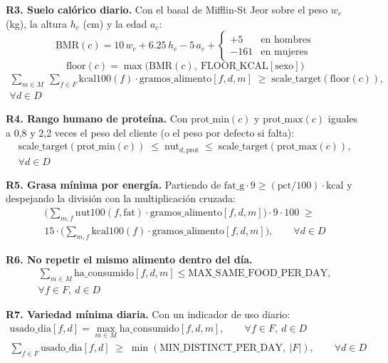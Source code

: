 \textbf{R3. Suelo calórico diario.} Con el basal de Mifflin-St Jeor sobre el peso $w_c$ (kg), la altura $h_c$ (cm) y la edad $a_c$:
\begin{equation*}
\text{BMR}(c) = 10\,w_c + 6.25\,h_c - 5\,a_c +
\begin{cases}
+5 & \text{en hombres} \\
-161 & \text{en mujeres}
\end{cases}
\end{equation*}
\begin{equation*}
\text{floor}(c) = \max\big(\text{BMR}(c),\ \text{FLOOR\_KCAL}[\text{sexo}]\big)
\end{equation*}
\begin{gather*}
\sum_{m \in M}\ \sum_{f \in F} \text{kcal100}(f) \cdot \text{gramos\_alimento}[f,d,m] \;\ge\; \text{scale\_target}(\text{floor}(c)), \\
\forall d \in D
\end{gather*}

\textbf{R4. Rango humano de proteína.} Con $\text{prot\_min}(c)$ y $\text{prot\_max}(c)$ iguales a 0,8 y 2,2 veces el peso del cliente (o el peso por defecto si falta):
\begin{gather*}
\text{scale\_target}(\text{prot\_min}(c)) \;\le\; \text{nut}_{d,\text{prot}} \;\le\; \text{scale\_target}(\text{prot\_max}(c)), \\
\forall d \in D
\end{gather*}

\textbf{R5. Grasa mínima por energía.} Partiendo de $\text{fat\_g} \cdot 9 \ge (\text{pct}/100) \cdot \text{kcal}$ y despejando la división con la multiplicación cruzada:
\begin{gather*}
\Big(\sum_{m,f} \text{nut100}(f, \text{fat}) \cdot \text{gramos\_alimento}[f,d,m]\Big) \cdot 9 \cdot 100 \;\ge\; \\
15 \cdot \Big(\sum_{m,f} \text{kcal100}(f) \cdot \text{gramos\_alimento}[f,d,m]\Big), \qquad \forall d \in D
\end{gather*}

\textbf{R6. No repetir el mismo alimento dentro del día.}
\begin{gather*}
\sum_{m \in M} \text{ha\_consumido}[f,d,m] \le \text{MAX\_SAME\_FOOD\_PER\_DAY}, \\
\forall f \in F,\ d \in D
\end{gather*}

\textbf{R7. Variedad mínima diaria.} Con un indicador de uso diario:
\begin{gather*}
\text{usado\_dia}[f,d] = \max_{m \in M} \text{ha\_consumido}[f,d,m], \qquad \forall f \in F,\ d \in D \\
\sum_{f \in F} \text{usado\_dia}[f,d] \;\ge\; \min(\text{MIN\_DISTINCT\_PER\_DAY},\ |F|), \qquad \forall d \in D
\end{gather*}


